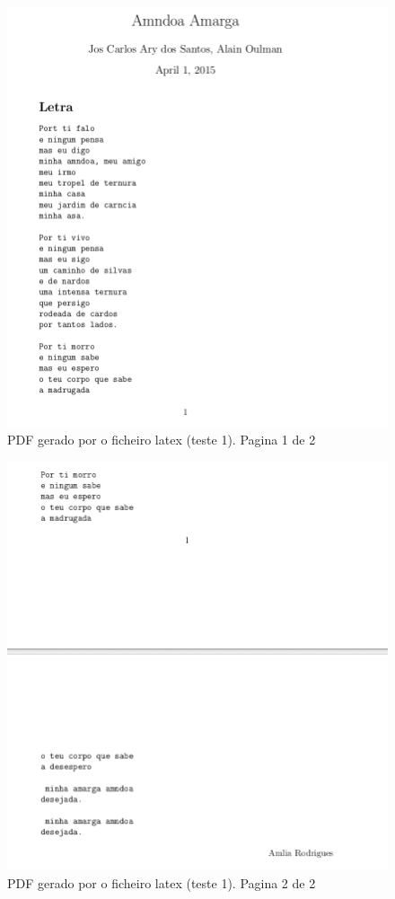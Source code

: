 \begin{figure}
\centering
\includegraphics[width=15cm]{anexos/2-5/2-5-a-img1.png}
\caption{PDF gerado por o ficheiro latex (teste 1). Pagina 1 de 2}
\end{figure}

\begin{figure}
\includegraphics[width=15cm]{anexos/2-5/2-5-a-img2.png}
\caption{PDF gerado por o ficheiro latex (teste 1). Pagina 2 de 2}
\label{fig::anex-music-test-img}
\end{figure}

